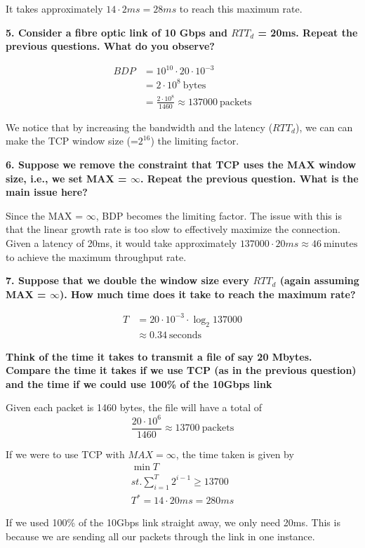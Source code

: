 \documentclass[]{article}
\newcommand{\e}{&=}
\begin{document}
It takes approximately $14 \cdot 2ms = 28ms$ to reach this maximum rate.

\textbf{5. Consider a fibre optic link of 10 Gbps and $RTT_d$ = 20ms. Repeat the previous questions.	What do you observe?}

\begin{align*}
BDP \e 10^{10} \cdot 20\cdot 10^{-3} \\
	\e 2 \cdot 10^8\ \text{bytes}\\
	\e \frac{2 \cdot 10^8}{1460} \approx 137000\ \text{packets}
\end{align*}

We notice that by increasing the bandwidth and the latency ($RTT_d$), we can can make the TCP window size (=$2^{16}$) the limiting factor. 

\textbf{6. Suppose we remove the constraint that TCP uses the MAX window size, i.e., we set MAX = $\infty$. Repeat the previous question. What is the main issue here?}

Since the MAX = $\infty$, BDP becomes the limiting factor. The issue with this is that the linear growth rate is too slow to effectively maximize the connection. Given a latency of 20ms, it would take approximately $137000 \cdot 20ms \approx 46\ \text{minutes}$ to achieve the maximum throughput rate. 

\textbf{7. Suppose that we double the window size every $RTT_d$	(again assuming MAX = $\infty$). How much time does it take to reach the maximum rate?}

\begin{align*}
T \e 20 \cdot 10^{-3} \cdot \log_2 137000 \\
	&\approx 0.34\ \text{seconds}
\end{align*}

\textbf{Think of the time it takes to transmit a file of say 20 Mbytes. Compare the time it takes if we use TCP (as in the previous question) and the time if we could use 100\% of the 10Gbps link}

Given each packet is 1460 bytes, the file will have a total of 
\[
\frac{20 \cdot 10^6 }{1460} \approx 13700\ \text{packets} 
\]

If we were to use TCP with $MAX = \infty$, the time taken is given by
\begin{gather*}
\min T \\
st. \sum_{i=1}^{T} 2^{i-1} \geq 13700 \\
T^* = 14 \cdot 20ms = 280ms
\end{gather*}

If we used 100\% of the 10Gbps link straight away, we only need 20ms. This is because we are sending all our packets through the link in one instance.
\end{document}

